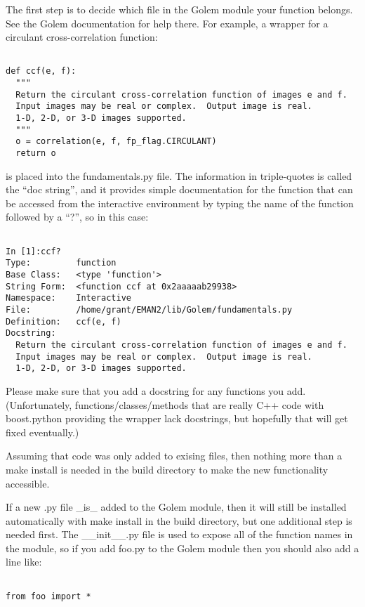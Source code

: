  The first step is to decide which file in the Golem module your function belongs. See the Golem documentation for help there. For example, a wrapper for a circulant cross-correlation function:
\begin{verbatim}

def ccf(e, f):
  """
  Return the circulant cross-correlation function of images e and f.
  Input images may be real or complex.  Output image is real.
  1-D, 2-D, or 3-D images supported.
  """
  o = correlation(e, f, fp_flag.CIRCULANT)
  return o

\end{verbatim}


 is placed into the fundamentals.py file. The information in triple-quotes is called the ``doc string'', and it provides simple documentation for the function that can be accessed from the interactive environment by typing the name of the function followed by a ``?'', so in this case:
\begin{verbatim}

In [1]:ccf?
Type:         function
Base Class:   <type 'function'>
String Form:  <function ccf at 0x2aaaaab29938>
Namespace:    Interactive
File:         /home/grant/EMAN2/lib/Golem/fundamentals.py
Definition:   ccf(e, f)
Docstring:
  Return the circulant cross-correlation function of images e and f.
  Input images may be real or complex.  Output image is real.
  1-D, 2-D, or 3-D images supported.

\end{verbatim}


 Please make sure that you add a docstring for any functions you add. (Unfortunately, functions/classes/methods that are really C++ code with boost.python providing the wrapper lack docstrings, but hopefully that will get fixed eventually.)


 Assuming that code was only added to exising files, then nothing more than a make install is needed in the build directory to make the new functionality accessible.


 If a new .py file \_is\_ added to the Golem module, then it will still be installed automatically with make install in the build directory, but one additional step is needed first. The \_\_init\_\_.py file is used to expose all of the function names in the module, so if you add foo.py to the Golem module then you should also add a line like:
\begin{verbatim}

from foo import *

\end{verbatim}


